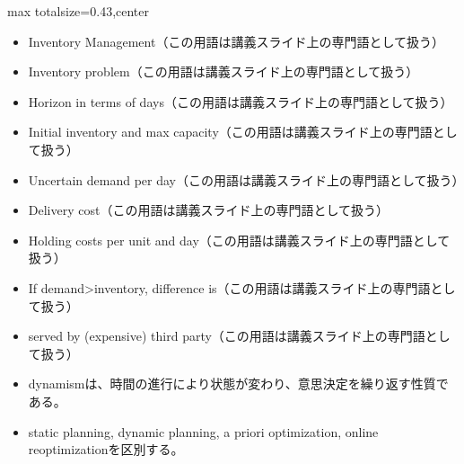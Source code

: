 \clearpage
{}
\begin{minipage}[t]{0.405\textwidth}
\begin{adjustbox}{max totalsize={\textwidth}{0.43\textheight},center}
\begin{minipage}{\textwidth}\scriptsize
{}\begin{itemize}
\item Inventory Management（この用語は講義スライド上の専門語として扱う）
\item Inventory problem（この用語は講義スライド上の専門語として扱う）
\item Horizon in terms of days（この用語は講義スライド上の専門語として扱う）
\item Initial inventory and max capacity（この用語は講義スライド上の専門語として扱う）
\item Uncertain demand per day（この用語は講義スライド上の専門語として扱う）
\item Delivery cost（この用語は講義スライド上の専門語として扱う）
\item Holding costs per unit and day（この用語は講義スライド上の専門語として扱う）
\item If demand>inventory, difference is（この用語は講義スライド上の専門語として扱う）
\item served by (expensive) third party（この用語は講義スライド上の専門語として扱う）
\end{itemize}\begin{itemize}
\item dynamismは、時間の進行により状態が変わり、意思決定を繰り返す性質である。
\item static planning, dynamic planning, a priori optimization, online reoptimizationを区別する。
\end{itemize}
\end{minipage}
\end{adjustbox}
\end{minipage}\hfill
